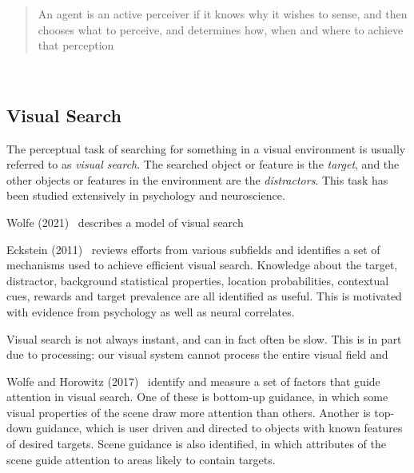 \begin{quote}
    An agent is an active perceiver if it knows why it wishes to sense, and then chooses what to perceive, and determines how, when and where to achieve that perception
\end{quote}~\cite{bajcsy_aloimonos_tsotsos_2018}


\subsection{Visual Search}
\label{sec:visualsearch}


The perceptual task of searching for something in a visual environment is usually referred to as \textit{visual search}.
The searched object or feature is the \textit{target}, and the other objects or features in the environment are the \textit{distractors}.
This task has been studied extensively in psychology and neuroscience.

Wolfe (2021)~\cite{wolfe_guided_2021} describes a model of visual search


Eckstein (2011)~\cite{eckstein_visual_2011} reviews efforts from various subfields and identifies a set of mechanisms used to achieve efficient visual search.
Knowledge about the target, distractor, background statistical properties, location probabilities, contextual cues, rewards and target prevalence are all identified as useful.
This is motivated with evidence from psychology as well as neural correlates.

Visual search is not always instant, and can in fact often be slow.
This is in part due to processing: our visual system cannot process the entire visual field and 


Wolfe and Horowitz (2017)~\cite{wolfe_horowitz_2017} identify and measure a set of factors that guide attention in visual search.
One of these is bottom-up guidance, in which some visual properties of the scene draw more attention than others.
Another is top-down guidance, which is user driven and directed to objects with known features of desired targets.
Scene guidance is also identified, in which attributes of the scene guide attention to areas likely to contain targets. 

